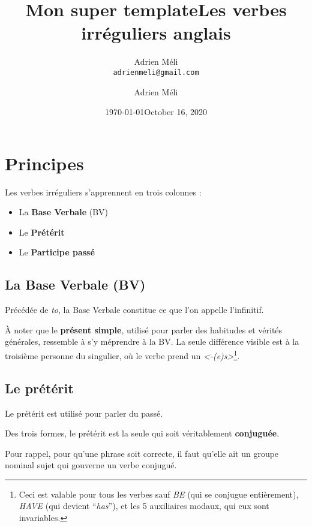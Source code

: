\documentclass[
  10pt,
]{article}
\title{Mon super template}
\author{Adrien M\'{e}li\\{\tt adrienmeli@gmail.com}}
\date{\today}
\title{Les verbes irréguliers anglais}
\author{Adrien Méli}
\date{October 16, 2020}
\begin{document}
\maketitle

\pagestyle{fancy}

\hypertarget{principes}{%
\section{Principes}\label{principes}}

Les verbes irréguliers s'apprennent en trois colonnes :

\begin{itemize}
\item
  La \textbf{Base Verbale} (BV)
\item
  Le \textbf{Prétérit}
\item
  Le \textbf{Participe passé}
\end{itemize}

\hypertarget{la-base-verbale-bv}{%
\subsection{La Base Verbale (BV)}\label{la-base-verbale-bv}}

Précédée de \emph{to}, la Base Verbale constitue ce que l'on appelle l'infinitif.

À noter que le \textbf{présent simple}, utilisé pour parler des habitudes et vérités générales, ressemble à s'y méprendre à la BV.
La seule différence visible est à la troisième personne du singulier, où le verbe prend un \emph{\textless-(e)s\textgreater{}}\footnote{Ceci est valable pour tous les verbes sauf \emph{BE} (qui se conjugue entièrement), \emph{HAVE} (qui devient ``\emph{has}''), et les 5 auxiliaires modaux, qui eux sont invariables.}.

\hypertarget{le-pruxe9tuxe9rit}{%
\subsection{Le prétérit}\label{le-pruxe9tuxe9rit}}

Le prétérit est utilisé pour parler du passé.

Des trois formes, le prétérit est la seule qui soit véritablement \textbf{conjuguée}.

Pour rappel, pour qu'une phrase soit correcte, il faut qu'elle ait un groupe nominal sujet qui gouverne un verbe conjugué.
\end{document}
